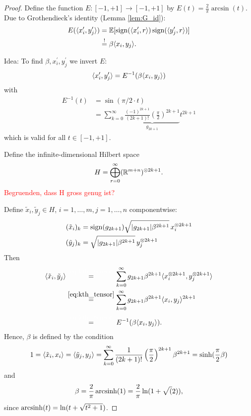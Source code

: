 \begin{proof}
	Define the function $E: [-1,+1] \to [-1,+1]$ by $E(t)=\frac{2}{\pi}\arcsin(t)$. Due to Grothendieck's identity (Lemma \ref{lem:G_id}):
	\begin{align*}
		E(\langle{x_i^\prime},{y_j^\prime}\rangle ) &= \mathbb{E}[\operatorname{sign}(\langle{x_i^\prime},{r}\rangle)\operatorname{sign}(\langle{y_j^\prime},{r}\rangle)]\\
		&\overset{!}{=}\beta \langle{x_i},{y_j}\rangle.
	\end{align*}
	
	Idea: To find $\beta,x_i^\prime,y_j^\prime$ we invert $E$:
	\[
		\langle{x_i^\prime},{y_j^\prime}\rangle = E^{-1} (\beta \langle{x_i},{y_j}\rangle)	
	\]
	with 
	\begin{align*}
		E^{-1}(t) &= \sin(\pi/2 \cdot t) \\
		&= \sum_{k=0}^\infty \underbrace{\frac{(-1)^{2k+1}}{(2k+1)!}\left(\frac{\pi}{2}\right)^{2k+1}}_{g_{2k+1}}  t^{2k+1}
	\end{align*}
	which is valid for all $t\in[-1,+1]$.
	
	Define the infinite-dimensional Hilbert space
	\begin{equation}
		H= \bigoplus_{r=0}^\infty (\mathbb{R}^{m+n})^{\otimes 2k+1}.
	\end{equation}
	\textcolor{red}{Begruenden, dass H gross genug ist?}
	
	Define $\tilde{x}_i, \tilde{y}_j\in H$, $i=1,\dots,m,j=1,\dots,n$ componentwise:
	\begin{align*}
		(\tilde{x}_i)_k &= \operatorname{sign}(g_{2k+1}) \sqrt{{\left|{g_{2k+1}}\right|}\beta^{2k+1}}\, x_i^{\otimes 2k+1} \\
		(\tilde{y}_j)_k &= \sqrt{{\left|{g_{2k+1}}\right|}\beta^{2k+1}} \,y_j^{\otimes 2k+1}
	\end{align*}
	Then 
	\begin{align*}
		\sclr{\tilde{x}_i}{\tilde{y}_j} &\overset{\textcolor{white}{\eqref*{eq:kth_tensor}}}{=} \sum_{k=0}^\infty g_{2k+1} \beta^{2k+1}\sclr{x_i^{\tensor 2k+1}}{y_j^{\tensor 2k+1}} \\
		&\overset{\eqref{eq:kth_tensor}}{=} \sum_{k=0}^\infty g_{2k+1} \beta^{2k+1} \sclr{x_i}{y_j}^{2k+1} \\
		&\overset{\textcolor{white}{\eqref*{eq:kth_tensor}}}{=} E^{-1}(\beta \sclr{x_i}{y_j}).
	\end{align*}
	Hence, $\beta$ is defined by the condition
	\[
		1 = \langle{\tilde{x}_i},{x_i}\rangle = \langle{\tilde{y}_j},{y_j}\rangle
		= \sum_{k=0}^\infty \frac{1}{(2k+1)!}\left(\frac{\pi}{2}\right)^{2k+1}\beta^{2k+1}=\sinh(\frac{\pi}{2}\beta)
	\]
	and
	\[
		\beta = \frac{2}{\pi} \operatorname{arcsinh}(1) = \frac{2}{\pi}\ln(1+\sqrt(2)),	
	\]
	since $\operatorname{arcsinh} (t) = \ln(t+\sqrt{t^2+1})$.


\end{proof}
